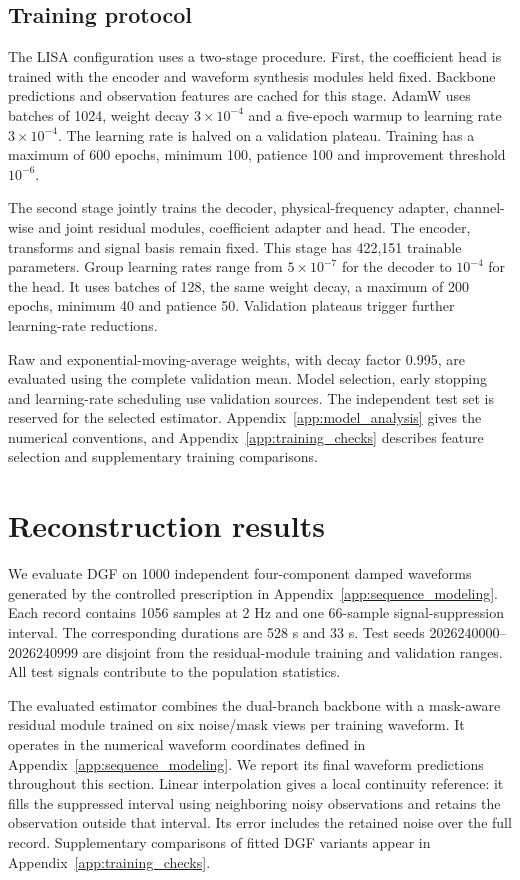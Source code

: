 \documentclass[10pt,prd,aps,a4paper,twocolumn,superscriptaddress,nofootinbib,floatfix]{revtex4-2}
\begin{document}
\subsection{Training protocol}\label{sec:training}
The LISA configuration uses a two-stage procedure. First, the coefficient head is trained with the encoder and waveform synthesis modules held fixed. Backbone predictions and observation features are cached for this stage. AdamW uses batches of 1024, weight decay $3\times10^{-4}$ and a five-epoch warmup to learning rate $3\times10^{-4}$. The learning rate is halved on a validation plateau. Training has a maximum of 600 epochs, minimum 100, patience 100 and improvement threshold $10^{-6}$.

The second stage jointly trains the decoder, physical-frequency adapter, channel-wise and joint residual modules, coefficient adapter and head. The encoder, transforms and signal basis remain fixed. This stage has 422,151 trainable parameters. Group learning rates range from $5\times10^{-7}$ for the decoder to $10^{-4}$ for the head. It uses batches of 128, the same weight decay, a maximum of 200 epochs, minimum 40 and patience 50. Validation plateaus trigger further learning-rate reductions.

Raw and exponential-moving-average weights, with decay factor 0.995, are evaluated using the complete validation mean. Model selection, early stopping and learning-rate scheduling use validation sources. The independent test set is reserved for the selected estimator. Appendix~\ref{app:model_analysis} gives the numerical conventions, and Appendix~\ref{app:training_checks} describes feature selection and supplementary training comparisons.

\section{Reconstruction results}\label{sec:results}
We evaluate DGF on 1000 independent four-component damped waveforms generated by the controlled prescription in Appendix~\ref{app:sequence_modeling}. Each record contains 1056 samples at 2 Hz and one 66-sample signal-suppression interval. The corresponding durations are 528 s and 33 s. Test seeds 2026240000--2026240999 are disjoint from the residual-module training and validation ranges. All test signals contribute to the population statistics.

The evaluated estimator combines the dual-branch backbone with a mask-aware residual module trained on six noise/mask views per training waveform. It operates in the numerical waveform coordinates defined in Appendix~\ref{app:sequence_modeling}. We report its final waveform predictions throughout this section. Linear interpolation gives a local continuity reference: it fills the suppressed interval using neighboring noisy observations and retains the observation outside that interval. Its error includes the retained noise over the full record. Supplementary comparisons of fitted DGF variants appear in Appendix~\ref{app:training_checks}.
\end{document}
